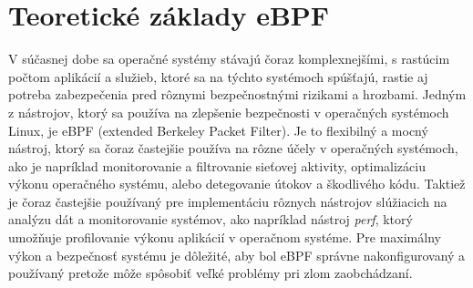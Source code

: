 \section{Teoretické základy eBPF}
V súčasnej dobe sa operačné systémy stávajú čoraz komplexnejšími, s rastúcim počtom aplikácií a služieb, ktoré sa na týchto systémoch spúšťajú, 
rastie aj potreba zabezpečenia pred rôznymi bezpečnostnými rizikami a hrozbami. Jedným z nástrojov, ktorý sa používa na zlepšenie bezpečnosti v 
operačných systémoch Linux, je eBPF (extended Berkeley Packet Filter). Je to flexibilný a mocný nástroj, ktorý sa čoraz častejšie používa na 
rôzne účely v operačných systémoch, ako je napríklad monitorovanie a filtrovanie sieťovej aktivity, optimalizáciu výkonu operačného systému, 
alebo detegovanie útokov a škodlivého kódu. Taktiež je čoraz častejšie používaný pre implementáciu rôznych nástrojov slúžiacich na analýzu dát 
a monitorovanie systémov, ako napríklad nástroj \emph{perf}, ktorý umožňuje profilovanie výkonu aplikácií v operačnom systéme. Pre maximálny výkon a 
bezpečnosť systému je dôležité, aby bol eBPF správne nakonfigurovaný a používaný pretože môže spôsobiť veľké problémy pri zlom zaobchádzaní.~\cite{eBPF}


